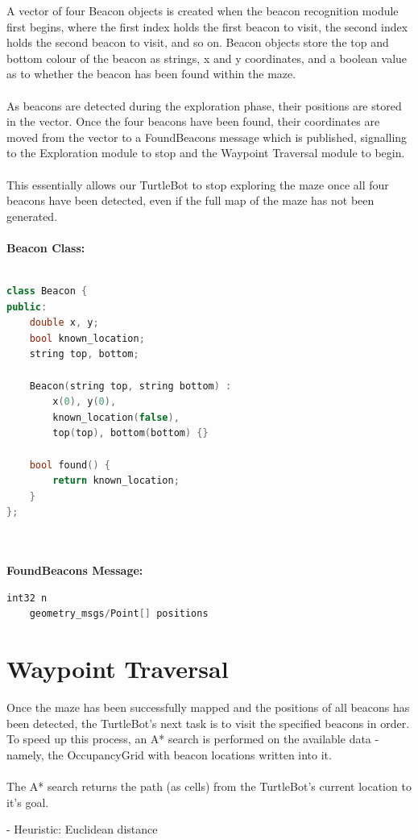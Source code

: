 \documentclass[titlepage,12pt,a4paper]{article}
\begin{document}
A vector of four Beacon objects is created when the beacon recognition module first begins, where the first index holds the first beacon to visit, the second index holds the second beacon to visit, and so on. Beacon objects store the top and bottom colour of the beacon as strings, x and y coordinates, and a boolean value as to whether the beacon has been found within the maze. \\
\\
As beacons are detected during the exploration phase, their positions are stored in the vector. Once the four beacons have been found, their coordinates are moved from the vector to a FoundBeacons message which is published, signalling to the Exploration module to stop and the Waypoint Traversal module to begin.\\
\\
This essentially allows our TurtleBot to stop exploring the maze once all four beacons have been detected, even if the full map of the maze has not been generated.\\
\\
\textbf{Beacon Class:}
\begin{lstlisting}[language=C++]

class Beacon {
public:
	double x, y;
	bool known_location;
	string top, bottom;
	
	Beacon(string top, string bottom) :
		x(0), y(0),
		known_location(false),
		top(top), bottom(bottom) {}
   
	bool found() {
		return known_location;
	}
};
	
\end{lstlisting}

\textbf{\\FoundBeacons Message:}
\begin{lstlisting}[language=C++]
	int32 n
	geometry_msgs/Point[] positions
\end{lstlisting}


\pagebreak


\section*{Waypoint Traversal}

Once the maze has been successfully mapped and the positions of all beacons has been detected, the TurtleBot's next task is to visit the specified beacons in order. To speed up this process, an A* search is performed on the available data - namely, the OccupancyGrid with beacon locations written into it.\\
\\
The A* search returns the path (as cells) from the TurtleBot's current location to it's goal.

- Heuristic: Euclidean distance
\end{document}
